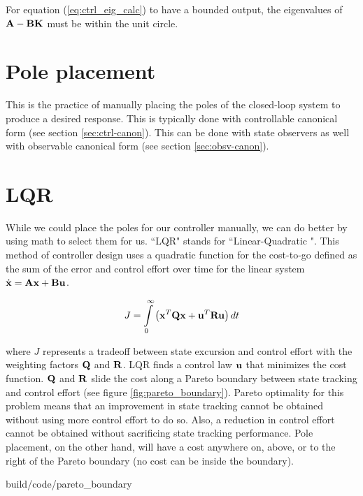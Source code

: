 For equation (\ref{eq:ctrl_eig_calc}) to have a bounded output, the eigenvalues
of $\mathbf{A} - \mathbf{B}\mathbf{K}$ must be within the unit circle.

\section{Pole placement}

This is the practice of manually placing the poles of the closed-loop system to
produce a desired response. This is typically done with controllable canonical
form (see section \ref{sec:ctrl-canon}). This can be done with state observers
as well with observable canonical form (see section \ref{sec:obsv-canon}).

\section{LQR} \label{sec:lqr}

While we could place the poles for our controller manually, we can do better by
using math to select them for us. ``LQR" stands for ``Linear-Quadratic
". This method of controller design uses a
quadratic function for the cost-to-go defined as the sum of the error and
control effort over time for the linear system
$\dot{\mathbf{x}} = \mathbf{A}\mathbf{x} + \mathbf{B}\mathbf{u}$.

\begin{equation*}
  J = \int\limits_0^\infty \left(\mathbf{x}^T\mathbf{Q}\mathbf{x} +
    \mathbf{u}^T\mathbf{R}\mathbf{u}\right) dt
\end{equation*}

where $J$ represents a tradeoff between \gls{state} excursion and control effort
with the weighting factors $\mathbf{Q}$ and $\mathbf{R}$. LQR finds a control law
$\mathbf{u}$ that minimizes the cost function. $\mathbf{Q}$ and $\mathbf{R}$ slide the
cost along a Pareto boundary between state tracking and control effort (see
figure \ref{fig:pareto_boundary}). Pareto optimality for this problem means that
an improvement in state tracking cannot be obtained without using more control
effort to do so. Also, a reduction in control effort cannot be obtained without
sacrificing state tracking performance. Pole placement, on the other hand, will
have a cost anywhere on, above, or to the right of the Pareto boundary (no cost
can be inside the boundary).

\begin{svg}{build/code/pareto_boundary}
  \caption{Pareto boundary for LQR}
  \label{fig:pareto_boundary}
\end{svg}

